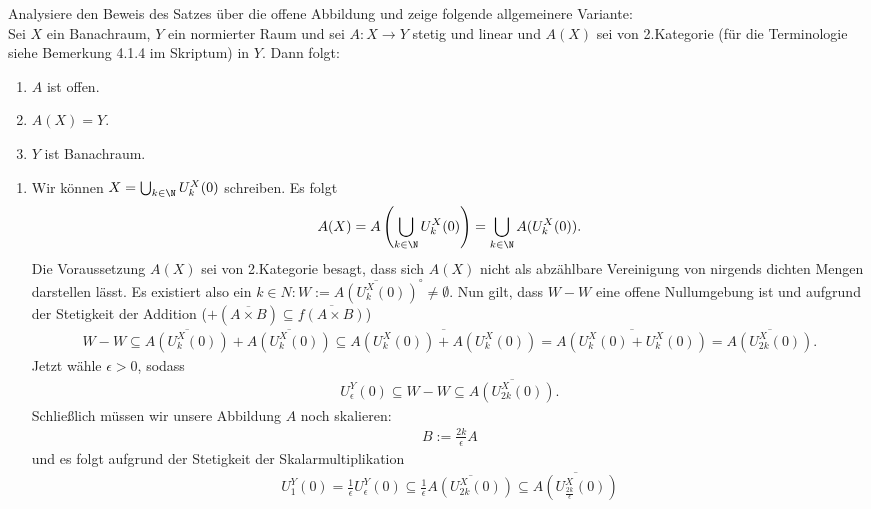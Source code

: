 \begin{exercise}
Analysiere den Beweis des Satzes über die offene Abbildung und zeige folgende
allgemeinere Variante: \\
Sei $X$ ein Banachraum, $Y$ ein normierter Raum und sei $A: X \rightarrow Y$ stetig
und linear und $A(X)$ sei von 2.Kategorie (für die Terminologie siehe Bemerkung
4.1.4 im Skriptum) in $Y$. Dann folgt:
\begin{enumerate}[label = (\roman*)]
  \item $A$ ist offen.
  \item $A(X) = Y$.
  \item $Y$ ist Banachraum.
\end{enumerate}
\end{exercise}
\begin{solution}
\begin{enumerate}[label = (\roman*)]
  \item
  Wir können $X = \bigcup_{k \in \N} U_k^X(0)$ schreiben. Es folgt
  \begin{align*}
    A(X) = A\left(\bigcup_{k \in \N} U_k^X(0)\right)
    = \bigcup_{k \in \N}A(U_k^X(0)).
  \end{align*}
  Die Voraussetzung $A(X)$ sei von 2.Kategorie besagt, dass sich $A(X)$
  nicht als abzählbare Vereinigung von nirgends dichten Mengen darstellen lässt.
  Es existiert also ein $k \in N: W := \overline{A(U_k^X(0))}^{\circ} \neq \emptyset$.
  Nun gilt, dass $W - W$ eine offene Nullumgebung ist und aufgrund der Stetigkeit
  der Addition ($+(\overline{A \times B}) \subseteq \overline{f(A \times B)}$)
  \begin{align*}
    W - W \subseteq \overline{A(U_k^X(0))} + \overline{A(U_k^X(0))}
    \subseteq \overline{A(U_k^X(0)) + A(U_k^X(0))}
    = \overline{A(U_k^X(0) + U_k^X(0))}
    = \overline{A(U_{2k}^X(0))}.
  \end{align*}
  Jetzt wähle $\epsilon > 0$, sodass
  \begin{align*}
    U_{\epsilon}^Y(0) \subseteq W - W \subseteq \overline{A(U_{2k}^X(0))}.
  \end{align*}
  Schließlich müssen wir unsere Abbildung $A$ noch skalieren:
  \begin{align*}
    B := \frac{2k}{\epsilon}A
  \end{align*}
  und es folgt aufgrund der Stetigkeit der Skalarmultiplikation
  \begin{align*}
    U_1^Y(0) = \frac{1}{\epsilon}U_{\epsilon}^Y(0) \subseteq
    \frac{1}{\epsilon} \overline{A(U_{2k}^X(0))}
    \subseteq \overline{A(U_{\frac{2k}{\epsilon}}^X(0))}

\end{align*}
\end{enumerate}
\end{solution}
